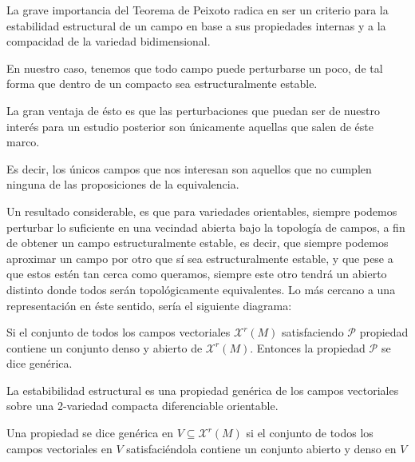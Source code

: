 \begin{rmrk}
	La grave importancia del Teorema de Peixoto radica en ser un criterio para la estabilidad estructural de un campo en base a sus propiedades internas y a la compacidad de la variedad bidimensional.
	
	En nuestro caso, tenemos que todo campo puede perturbarse un poco, de tal forma que dentro de un compacto sea estructuralmente estable.
 
	La gran ventaja de ésto es que las perturbaciones que puedan ser de nuestro interés para un estudio posterior son únicamente aquellas que salen de éste marco.
	
	Es decir, los únicos campos que nos interesan son aquellos que no cumplen ninguna de las proposiciones de la equivalencia.
\end{rmrk}

\begin{visua}
	Un resultado considerable, es que para variedades orientables, siempre podemos perturbar lo suficiente en una vecindad abierta bajo la topología de campos, a fin de obtener un campo estructuralmente estable, es decir, que siempre podemos aproximar un campo por otro que sí sea estructuralmente estable, y que pese a que estos estén tan cerca como queramos, siempre este otro tendrá un abierto distinto donde todos serán topológicamente equivalentes. Lo más cercano  a una representación en éste sentido, sería el siguiente diagrama:
	
	\begin{tikzpicture}
		
	\end{tikzpicture}
\end{visua}

\begin{defn}
	Si el conjunto de todos los campos vectoriales $\mathcal{X}^r(M)$ satisfaciendo $\mathcal{P}$ propiedad contiene un conjunto denso y abierto de $\mathcal{X}^r(M)$. Entonces la propiedad $\mathcal{P}$ se dice genérica.
\end{defn}

\begin{cor}
	La estabibilidad estructural es una propiedad genérica de los campos vectoriales sobre una 2-variedad compacta  diferenciable orientable.
\end{cor}

\begin{defn}
	Una propiedad se dice genérica en $V\subseteq \mathcal{X}^r(M)$ si  el conjunto de todos los campos vectoriales en $V$ satisfaciéndola contiene un conjunto abierto y denso en $V$
\end{defn}

